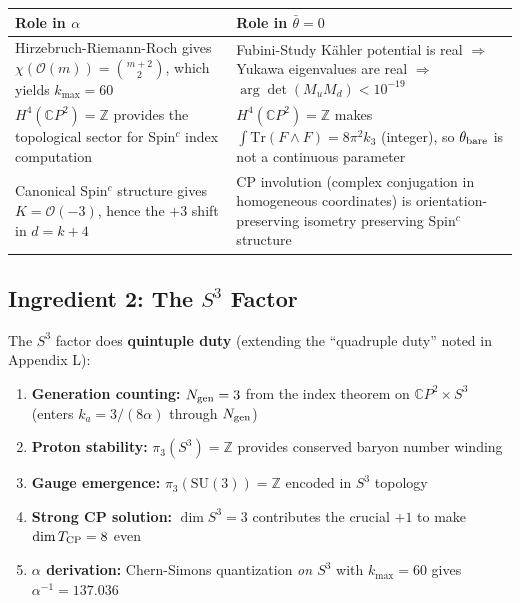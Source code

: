 \documentclass[11pt]{article}
\theoremstyle{remark}
\begin{document}
\begin{center}
\renewcommand{\arraystretch}{1.3}
\begin{tabular}{p{}p{}}
\hline
\textbf{Role in $\alpha$} & \textbf{Role in $\bar\theta = 0$} \\
\hline
Hirzebruch-Riemann-Roch gives
$\chi(\mathcal{O}(m)) = \binom{m+2}{2}$, which yields
$k_{\max} = 60$ &
Fubini-Study K\"ahler potential is real
$\Rightarrow$ Yukawa eigenvalues are real
$\Rightarrow$ $\arg\det(M_u M_d) < 10^{-19}$ \\[6pt]
$H^4(\mathbb{C}P^2) = \mathbb{Z}$ provides the
topological sector for Spin$^c$ index computation &
$H^4(\mathbb{C}P^2) = \mathbb{Z}$ makes
$\int\mathrm{Tr}(F \wedge F) = 8\pi^2 k_3$ (integer),
so $\theta_{\rm bare}$ is not a continuous parameter \\[6pt]
Canonical Spin$^c$ structure gives $K = \mathcal{O}(-3)$,
hence the $+3$ shift in $d = k + 4$ &
CP involution (complex conjugation in homogeneous
coordinates) is orientation-preserving isometry preserving
Spin$^c$ structure \\
\hline
\end{tabular}
\end{center}

\subsection{Ingredient 2: The $S^3$ Factor}

The $S^3$ factor does \textbf{quintuple duty} (extending the ``quadruple duty''
noted in Appendix L):

\begin{enumerate}
\item \textbf{Generation counting:}
$N_{\rm gen} = 3$ from the index theorem on $\mathbb{C}P^2 \times S^3$
(enters $k_a = 3/(8\alpha)$ through $N_{\rm gen}$)

\item \textbf{Proton stability:}
$\pi_3(S^3) = \mathbb{Z}$ provides conserved baryon number winding

\item \textbf{Gauge emergence:}
$\pi_3(\mathrm{SU}(3)) = \mathbb{Z}$ encoded in $S^3$ topology

\item \textbf{Strong CP solution:}
$\dim S^3 = 3$ contributes the crucial $+1$ to make $\dim T_{\rm CP} = 8$ even

\item \textbf{$\alpha$ derivation:}
Chern-Simons quantization \emph{on $S^3$} with $k_{\max} = 60$ gives
$\alpha^{-1} = 137.036$
\end{enumerate}
\end{document}
